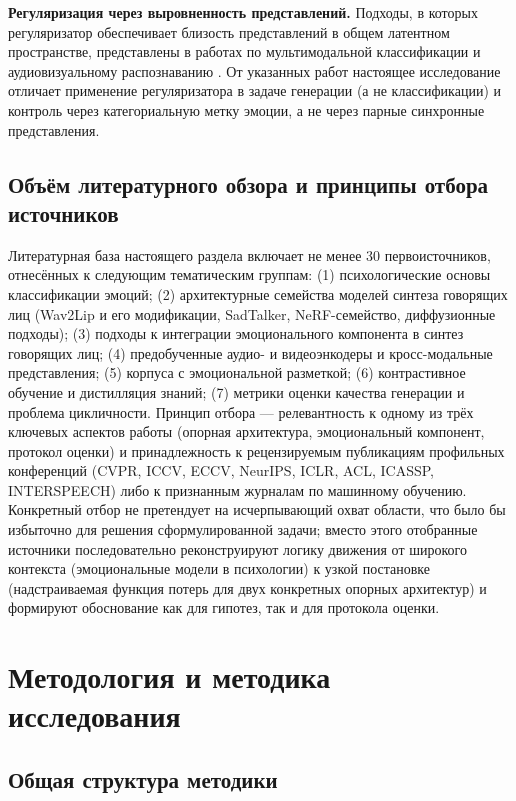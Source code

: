 \documentclass[a4paper, 12pt, oneside, openany]{article}
\begin{document}
\textbf{Регуляризация через выровненность представлений.} Подходы, в которых регуляризатор обеспечивает близость представлений в общем латентном пространстве, представлены в работах по мультимодальной классификации \cite{tsai2019mult} и аудиовизуальному распознаванию \cite{zhang2024}. От указанных работ настоящее исследование отличает применение регуляризатора в задаче генерации (а не классификации) и контроль через категориальную метку эмоции, а не через парные синхронные представления.

\subsection{Объём литературного обзора и принципы отбора источников}

Литературная база настоящего раздела включает не менее 30 первоисточников, отнесённых к следующим тематическим группам: (1) психологические основы классификации эмоций; (2) архитектурные семейства моделей синтеза говорящих лиц (Wav2Lip и его модификации, SadTalker, NeRF-семейство, диффузионные подходы); (3) подходы к интеграции эмоционального компонента в синтез говорящих лиц; (4) предобученные аудио- и видеоэнкодеры и кросс-модальные представления; (5) корпуса с эмоциональной разметкой; (6) контрастивное обучение и дистилляция знаний; (7) метрики оценки качества генерации и проблема цикличности. Принцип отбора --- релевантность к одному из трёх ключевых аспектов работы (опорная архитектура, эмоциональный компонент, протокол оценки) и принадлежность к рецензируемым публикациям профильных конференций (CVPR, ICCV, ECCV, NeurIPS, ICLR, ACL, ICASSP, INTERSPEECH) либо к признанным журналам по машинному обучению. Конкретный отбор не претендует на исчерпывающий охват области, что было бы избыточно для решения сформулированной задачи; вместо этого отобранные источники последовательно реконструируют логику движения от широкого контекста (эмоциональные модели в психологии) к узкой постановке (надстраиваемая функция потерь для двух конкретных опорных архитектур) и формируют обоснование как для гипотез, так и для протокола оценки.


\section{Методология и методика исследования}

\subsection{Общая структура методики}
\end{document}
